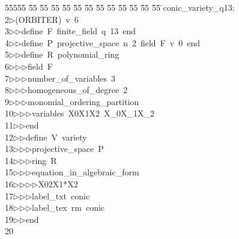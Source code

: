 %
%
\begin{tabbing}
55555 \= 55 \= 55 \= 55 \= 55 \= 55 \= 55 \= 55 \= 55 \= 55 \= 55 \= 55 \= 55 \= \>conic\_variety\_q13:\\[0pt]
2\>$\triangleright$\>(ORBITER)\ v\ 6\ \\[0pt]
3\>$\triangleright$\>$\triangleright$\>define\ F\ finite\_field\ q\ 13\ end\ \\[0pt]
4\>$\triangleright$\>$\triangleright$\>define\ P\ projective\_space\ n\ 2\ field\ F\ v\ 0\ end\ \\[0pt]
5\>$\triangleright$\>$\triangleright$\>define\ R\ polynomial\_ring\ \\[0pt]
6\>$\triangleright$\>$\triangleright$\>$\triangleright$\>field\ F\ \\[0pt]
7\>$\triangleright$\>$\triangleright$\>$\triangleright$\>number\_of\_variables\ 3\ \\[0pt]
8\>$\triangleright$\>$\triangleright$\>$\triangleright$\>homogeneous\_of\_degree\ 2\ \\[0pt]
9\>$\triangleright$\>$\triangleright$\>$\triangleright$\>monomial\_ordering\_partition\ \\[0pt]
10\>$\triangleright$\>$\triangleright$\>$\triangleright$\>variables\ X0X1X2\ X\_0X\_1X\_2\ \\[0pt]
11\>$\triangleright$\>$\triangleright$\>end\ \\[0pt]
12\>$\triangleright$\>$\triangleright$\>define\ V\ variety\ \\[0pt]
13\>$\triangleright$\>$\triangleright$\>$\triangleright$\>projective\_space\ P\ \\[0pt]
14\>$\triangleright$\>$\triangleright$\>$\triangleright$\>ring\ R\ \\[0pt]
15\>$\triangleright$\>$\triangleright$\>$\triangleright$\>equation\_in\_algebraic\_form\ \\[0pt]
16\>$\triangleright$\>$\triangleright$\>$\triangleright$\>$\triangleright$\>X02X1*X2\ \\[0pt]
17\>$\triangleright$\>$\triangleright$\>$\triangleright$\>label\_txt\ conic\ \\[0pt]
18\>$\triangleright$\>$\triangleright$\>$\triangleright$\>label\_tex\ rm\ conic\ \\[0pt]
19\>$\triangleright$\>$\triangleright$\>end\\[0pt]
20\>\end{tabbing}
